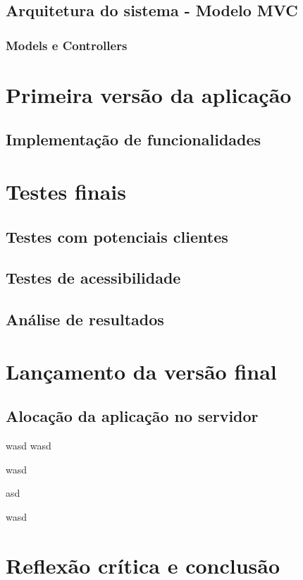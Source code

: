 \documentclass[11pt, twoside]{report}
\begin{document}
	\section{Arquitetura do sistema - Modelo MVC}
	\subsection{Models e Controllers}
	
	\chapter{Primeira versão da aplicação}
	\section{Implementação de funcionalidades}
	
	\chapter{Testes finais}
	\section{Testes com potenciais clientes}
	\section{Testes de acessibilidade}
	\section{Análise de resultados}
	
	\chapter{Lançamento da versão final}
	\section{Alocação da aplicação no servidor}
	
	\pagebreak
	wasd
	wasd
	
	
	wasd
	
	
	\pagebreak
	
	asd
	
	wasd
	\chapter{Reflexão crítica e conclusão}
	
	

	
	
	
\end{document}
